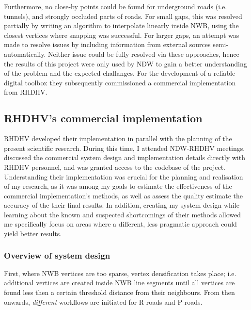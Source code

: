 Furthermore, no close-by points could be found for underground roads (i.e. tunnels), and strongly occluded parts of roads. For small gaps, this was resolved partially by writing an algorithm to interpolate linearly inside NWB, using the closest vertices where snapping was successful. For larger gaps, an attempt was made to resolve issues by including information from external sources semi-automatically. Neither issue could be fully resolved via these approaches, hence the results of this project were only used by NDW to gain a better understanding of the problem and the expected challanges. For the development of a reliable digital toolbox they subsequently commissioned a commercial implementation from RHDHV.

\subsection{RHDHV's commercial implementation}
\label{sub:commercialproduct}

RHDHV developed their implementation in parallel with the planning of the present scientific research. During this time, I attended NDW-RHDHV meetings, discussed the commercial system design and implementation details directly with RHDHV personnel, and was granted access to the codebase of the project. Understanding their implementation was crucial for the planning and realisation of my research, as it was among my goals to estimate the effectiveness of the commercial implementation's methods, as well as assess the quality estimate the accuracy of the their final results. In addition, creating my system design while learning about the known and suspected shortcomings of their methods allowed me specifically focus on areas where a different, less pragmatic approach could yield better results.

\subsubsection{Overview of system design}

First, where NWB vertices are too sparse, vertex densification takes place; i.e. additional vertices are created inside NWB line segments until all vertices are found less then a certain threshold distance from their neighbours. From then onwards, \textit{different} workflows are initiated for R-roads and P-roads.

